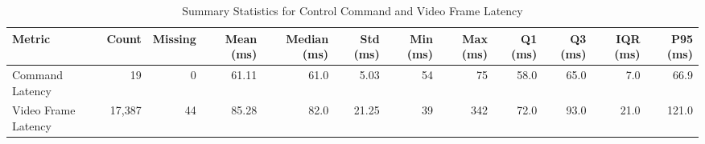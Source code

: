     \begin{table}[ht]
        \centering
        \footnotesize
        \setlength{\tabcolsep}{4.5pt}
        \caption{Summary Statistics for Control Command and Video Frame Latency}
        \label{tab:latency_stats}
        \begin{tabular}{lrrrrrrrrrrr}
            \toprule
            \textbf{Metric} & \textbf{Count} & \textbf{Missing} & \textbf{Mean (ms)} & \textbf{Median (ms)} & \textbf{Std (ms)} & \textbf{Min (ms)} & \textbf{Max (ms)} & \textbf{Q1 (ms)} & \textbf{Q3 (ms)} & \textbf{IQR (ms)} & \textbf{P95 (ms)} \\
            \midrule
            Command Latency      &     19 &  0 & 61.11 & 61.0 &  5.03 &  54 &  75 & 58.0 & 65.0 &  7.0 &  66.9 \\
            Video Frame Latency  & 17{,}387 & 44 & 85.28 & 82.0 & 21.25 &  39 & 342 & 72.0 & 93.0 & 21.0 & 121.0 \\
            \bottomrule
        \end{tabular}
    \end{table}
